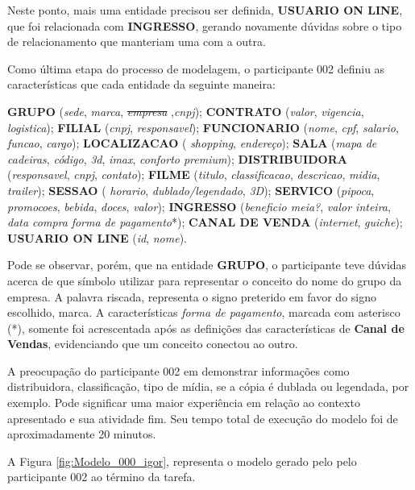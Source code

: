 Neste ponto, mais uma entidade precisou ser definida, \textbf{USUARIO ON LINE}, que foi relacionada com \textbf{INGRESSO}, gerando novamente dúvidas sobre o tipo de relacionamento que manteriam uma com a outra.

Como última etapa do processo de modelagem, o participante 002 definiu as características que cada entidade da seguinte maneira:

\textbf{GRUPO} (\textit{sede}, \textit{marca}, \sout{\textit{empresa}} ,\textit{cnpj}); \textbf{CONTRATO} (\textit{valor}, \textit{vigencia}, \textit{logistica}); \textbf{FILIAL} (\textit{cnpj}, \textit{responsavel}); \textbf{FUNCIONARIO} (\textit{nome}, \textit{cpf}, \textit{salario}, \textit{funcao}, \textit{cargo}); \textbf{LOCALIZACAO} ( \textit{shopping}, \textit{endereço}); \textbf{SALA} (\textit{mapa de cadeiras}, \textit{código}, \textit{3d}, \textit{imax}, \textit{conforto premium}); \textbf{DISTRIBUIDORA} (\textit{responsavel}, \textit{cnpj}, \textit{contato}); \textbf{FILME} (\textit{titulo}, \textit{classificacao}, \textit{descricao}, \textit{midia}, \textit{trailer}); \textbf{SESSAO} ( \textit{horario}, \textit{dublado/legendado}, \textit{3D}); \textbf{SERVICO} (\textit{pipoca}, \textit{promocoes}, \textit{bebida}, \textit{doces}, \textit{valor}); \textbf{INGRESSO} (\textit{beneficio meia?}, \textit{valor inteira}, \textit{data compra} \textit{forma de pagamento}*); \textbf{CANAL DE VENDA} (\textit{internet}, \textit{guiche}); \textbf{USUARIO ON LINE} (\textit{id}, \textit{nome}).

Pode se observar, porém, que na entidade \textbf{GRUPO}, o participante teve dúvidas acerca de que símbolo utilizar para representar o conceito do nome do grupo da empresa. A palavra riscada, representa o signo preterido em favor do signo escolhido, marca. A características \textit{forma de pagamento}, marcada com asterisco (*), somente foi acrescentada após as definições das características de \textbf{Canal de Vendas}, evidenciando que um conceito conectou ao outro.

A preocupação do participante 002 em demonstrar informações como distribuidora, classificação, tipo de mídia, se a cópia é dublada ou legendada, por exemplo. Pode significar uma maior experiência em relação ao contexto apresentado e sua atividade fim. Seu tempo total de execução do modelo foi de aproximadamente 20 minutos.

A Figura \ref{fig:Modelo_000_igor}, representa o modelo gerado pelo pelo participante 002 ao término da tarefa.

